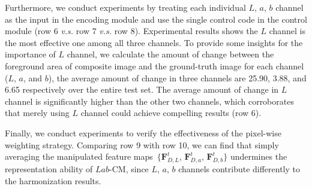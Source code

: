 \documentclass[sigconf]{acmart}
\begin{document}
Furthermore, we conduct experiments by treating each individual $L$, $a$, $b$ channel as the input in the encoding module and use the single control code in the control module (row 6 \emph{v.s.} row 7 \emph{v.s.} row 8). 
Experimental results shows the $L$ channel is the most effective one among all three channels. 
To provide some insights for the importance of $L$ channel, we calculate the amount of change between the foreground area of composite image and the ground-truth image for each channel ($L$, $a$, and $b$), the average amount of change in three channels are 25.90, 3.88, and 6.65 respectively over the entire test set.
The average amount of change in $L$ channel is significantly higher than the other two channels, which corroborates that merely using $L$ channel could achieve compelling results (row 6). 

Finally, we conduct experiments to verify the effectiveness of the pixel-wise weighting strategy.
Comparing row 9 with row 10, we can find that simply averaging the manipulated feature maps~$\{\bm{F}_{D, \textit{L}}^{t}$, $\bm{F}_{D, \textit{a}}^{t}$, $\bm{F}_{D, \textit{b}}^{t}\}$ undermines the representation ability of $Lab$-CM, since $L$, $a$, $b$ channels contribute differently to the harmonization results.
\end{document}
